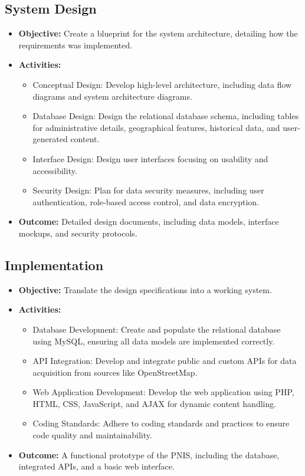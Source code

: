 \subsection{System Design}
\begin{itemize}
    \item \textbf{Objective:} Create a blueprint for the system architecture, detailing how the requirements was implemented.
    \item \textbf{Activities:}
        \begin{itemize}
            \item Conceptual Design: Develop high-level architecture, including data flow diagrams and system architecture diagrams.
            \item Database Design: Design the relational database schema, including tables for administrative details, geographical features, historical data, and user-generated content.
            \item Interface Design: Design user interfaces focusing on usability and accessibility.
            \item Security Design: Plan for data security measures, including user authentication, role-based access control, and data encryption.
        \end{itemize}
    \item \textbf{Outcome:} Detailed design documents, including data models, interface mockups, and security protocols.
\end{itemize}

\subsection{Implementation}
\begin{itemize}
    \item \textbf{Objective:} Translate the design specifications into a working system.
    \item \textbf{Activities:}
        \begin{itemize}
            \item Database Development: Create and populate the relational database using MySQL, ensuring all data models are implemented correctly.
            \item API Integration: Develop and integrate public and custom APIs for data acquisition from sources like OpenStreetMap.
            \item Web Application Development: Develop the web application using PHP, HTML, CSS, JavaScript, and AJAX for dynamic content handling.
            \item Coding Standards: Adhere to coding standards and practices to ensure code quality and maintainability.
        \end{itemize}
    \item \textbf{Outcome:} A functional prototype of the PNIS, including the database, integrated APIs, and a basic web interface.
\end{itemize}

